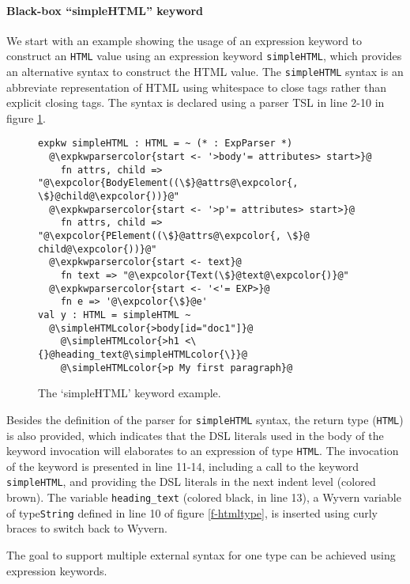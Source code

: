 \documentclass{sig-alternate}
\newcommand{\expkwparsercolor}[1]{\textcolor[HTML]{336699}{#1}}
\newcommand{\expcolor}[1]{\textcolor[HTML]{FF0033}{#1}}
\newcommand{\simpleHTMLcolor}[1]{\textcolor[HTML]{7D5100}{#1}}
\begin{document}
\paragraph{Black-box ``simpleHTML'' keyword}
We start with an example showing the usage of an expression keyword to construct an \verb|HTML| value using an expression keyword \verb|simpleHTML|, which provides an alternative syntax to construct the HTML value. The \verb|simpleHTML| syntax is an abbreviate representation of HTML using whitespace to close tags rather than explicit closing tags. The syntax is declared using a parser TSL in line 2-10 in figure \ref{f-simplehtml}.
\begin{figure}[ht]
\begin{lstlisting}[style=wyvern]
expkw simpleHTML : HTML = ~ (* : ExpParser *)
  @\expkwparsercolor{start <- '>body'= attributes> start>}@
    fn attrs, child => "@\expcolor{BodyElement((\$}@attrs@\expcolor{, \$}@child@\expcolor{))}@"
  @\expkwparsercolor{start <- '>p'= attributes> start>}@
    fn attrs, child => "@\expcolor{PElement((\$}@attrs@\expcolor{, \$}@ child@\expcolor{))}@"
  @\expkwparsercolor{start <- text}@
    fn text => "@\expcolor{Text(\$}@text@\expcolor{)}@"
  @\expkwparsercolor{start <- '<'= EXP>}@
    fn e => '@\expcolor{\$}@e'
val y : HTML = simpleHTML ~
  @\simpleHTMLcolor{>body[id="doc1"]}@
    @\simpleHTMLcolor{>h1 <\{}@heading_text@\simpleHTMLcolor{\}}@
    @\simpleHTMLcolor{>p My first paragraph}@
\end{lstlisting}
\caption{The `simpleHTML' keyword example.}
\label{f-simplehtml}
\end{figure}

Besides the definition of the parser for \verb|simpleHTML| syntax, the return type (\verb|HTML|) is also provided, which indicates that the DSL literals used in the body of the keyword invocation will elaborates to an expression of type \verb|HTML|. The invocation of the keyword is presented in line 11-14, including a call to the keyword \verb|simpleHTML|, and providing the DSL literals in the next indent level (colored brown). The variable \verb|heading_text| (colored black, in line 13), a Wyvern variable of type\verb|String| defined in line 10 of figure \ref{f-htmltype}, is inserted using curly braces to switch back to Wyvern.

The goal to support multiple external syntax for one type can be achieved using expression keywords.
\end{document}
